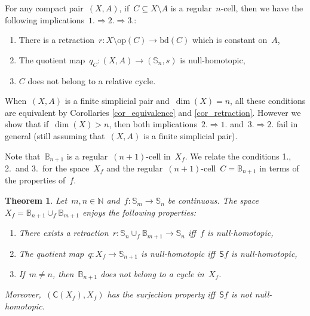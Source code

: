 \documentclass[english,11pt]{article}
\theoremstyle{plain}
\newtheorem{theorem}{Theorem}[section]
\theoremstyle{remark}
\theoremstyle{definition}
\newcommand{\bd}[1]{\mathrm{bd}(#1)}
\newcommand{\op}[1]{\mathrm{op}(#1)}
\newcommand{\Sp}{\mathbb{S}}
\newcommand{\BB}{\mathbb{B}}
\newcommand{\N}{\mathbb{N}}
\newcommand{\C}[1]{\mathsf{C}(#1)}%
\newcommand{\sus}{\mathsf{S}}
\begin{document}
For any compact pair~$(X,A)$, if~$C\subseteq X\setminus A$ is a regular~$n$-cell, then we have the following implications~$1.\Rightarrow 2. \Rightarrow 3.$:
\begin{enumerate}
\item There is a retraction~$r:X\setminus \op{C}\to\bd{C}$ which is constant on~$A$,
\item The quotient map~$q_C:(X,A)\to (\Sp_n,s)$ is null-homotopic,
\item $C$ does not belong to a relative cycle.
\end{enumerate}

When~$(X,A)$ is a finite simplicial pair and~$\dim(X)=n$, all these conditions are equivalent by Corollaries \ref{cor_equivalence} and \ref{cor_retraction}. However we show that if~$\dim(X)>n$, then both implications~$2.\Rightarrow 1.$ and~$3.\Rightarrow 2.$ fail in general (still assuming that~$(X,A)$ is a finite simplicial pair).



Note that~$\BB_{n+1}$ is a regular~$(n+1)$-cell in~$X_f$.  We relate the conditions 1., 2.~and 3.~for the space~$X_f$ and the regular~$(n+1)$-cell~$C=\BB_{n+1}$ in terms of the properties of~$f$.

\begin{theorem}\label{thm_Xf}
Let~$m, n\in\N$ and~$f:\Sp_m\to\Sp_n$ be continuous. The space~$X_f=\BB_{n+1}\cup_f\BB_{m+1}$ enjoys the following properties:
\begin{enumerate}[label=(\alph*)]
\item There exists a retraction~$r:\Sp_n\cup_f\BB_{m+1}\to \Sp_n$ iff~$f$ is null-homotopic,
\item The quotient map~$q:X_f\to \Sp_{n+1}$ is null-homotopic iff~$\sus f$ is null-homotopic,
\item If~$m\neq n$, then~$\BB_{n+1}$ does not belong to a cycle in~$X_f$.%
\end{enumerate}

Moreover,~$(\C{X_f},X_f)$ has the surjection property iff~$\sus f$ is not null-homotopic.
\end{theorem}
\end{document}
